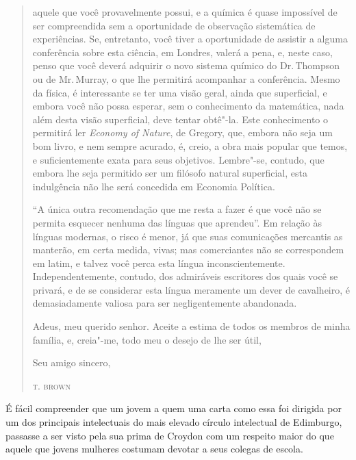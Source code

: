 \begin{quote}
aquele que você provavelmente possui, e a química é quase impossível de
ser compreendida sem a oportunidade de observação sistemática de
experiências. Se, entretanto, você tiver a oportunidade de assistir a
alguma conferência sobre esta ciência, em Londres, valerá a pena, e,
neste caso, penso que você deverá adquirir o novo sistema químico do Dr.\,Thompson ou de Mr.\,Murray, o que lhe permitirá acompanhar a conferência.
Mesmo da física, é interessante se ter uma visão geral, ainda que
superficial, e embora você não possa esperar, sem o conhecimento da
matemática, nada além desta visão superficial, deve tentar obtê"-la. Este
conhecimento o permitirá ler \textit{Economy of Nature}, de Gregory, que,
embora não seja um bom livro, e nem sempre acurado, é, creio, a obra
mais popular que temos, e suficientemente exata para seus objetivos.
Lembre"-se, contudo, que embora lhe seja permitido ser um filósofo
natural superficial, esta indulgência não lhe será concedida em Economia
Política.

``A única outra recomendação que me resta a fazer é que você não se
permita esquecer nenhuma das línguas que aprendeu''. Em relação às
línguas modernas, o risco é menor, já que suas comunicações mercantis as
manterão, em certa medida, vivas; mas comerciantes não se correspondem
em latim, e talvez você perca esta língua inconscientemente.
Independentemente, contudo, dos admiráveis escritores dos quais você se
privará, e de se considerar esta língua meramente um dever de
cavalheiro, é demasiadamente valiosa para ser negligentemente
abandonada.

Adeus, meu querido senhor. Aceite a estima de todos os membros de minha
família, e, creia"-me, todo meu o desejo de lhe ser útil,

\bigskip

\hfill{}Seu amigo sincero,

\hfill{}\textsc{t. brown}
\end{quote}

É fácil compreender que um jovem a quem uma carta como essa foi
dirigida por um dos principais intelectuais do mais elevado círculo
intelectual de Edimburgo, passasse a ser visto pela sua prima de Croydon
com um respeito maior do que aquele que jovens mulheres costumam devotar
a seus colegas de escola.

